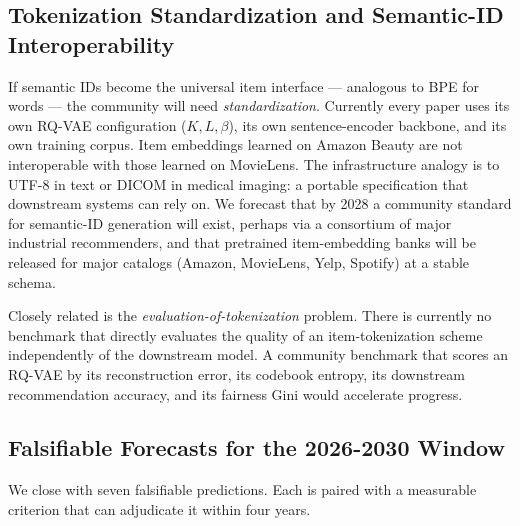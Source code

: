 \subsection{Tokenization Standardization and Semantic-ID Interoperability}\label{tokenization-standardization-and-semantic-id-interoperability}

If semantic IDs become the universal item interface --- analogous to BPE for words --- the community will need \emph{standardization}. Currently every paper uses its own RQ-VAE configuration (\(K, L, \beta\)), its own sentence-encoder backbone, and its own training corpus. Item embeddings learned on Amazon Beauty are not interoperable with those learned on MovieLens. The infrastructure analogy is to UTF-8 in text or DICOM in medical imaging: a portable specification that downstream systems can rely on. We forecast that by 2028 a community standard for semantic-ID generation will exist, perhaps via a consortium of major industrial recommenders, and that pretrained item-embedding banks will be released for major catalogs (Amazon, MovieLens, Yelp, Spotify) at a stable schema.

Closely related is the \emph{evaluation-of-tokenization} problem. There is currently no benchmark that directly evaluates the quality of an item-tokenization scheme independently of the downstream model. A community benchmark that scores an RQ-VAE by its reconstruction error, its codebook entropy, its downstream recommendation accuracy, and its fairness Gini would accelerate progress.

\subsection{Falsifiable Forecasts for the 2026-2030 Window}\label{falsifiable-forecasts-for-the-2026-2030-window}

We close with seven falsifiable predictions. Each is paired with a measurable criterion that can adjudicate it within four years.

